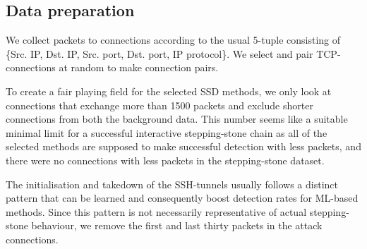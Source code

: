 \documentclass[runningheads,11pt]{llncs}\usepackage[]{graphicx}\usepackage[]{color}
\begin{document}

\subsection{Data preparation}


We collect packets to connections according to the usual 5-tuple consisting of \{Src. IP, Dst. IP, Src. port, Dst. port, IP protocol\}. We select and pair TCP-connections at random to make %
connection pairs. 

To create a fair playing field for the selected SSD methods, we only look at connections that exchange more than 1500 packets and exclude shorter connections from both the background data. This number seems like a suitable minimal limit for a successful interactive stepping-stone chain as all of the selected methods are supposed to make successful detection with less packets, and there were no connections with less packets in the stepping-stone dataset. %

The initialisation and takedown of the SSH-tunnels usually follows a distinct pattern that can be learned and consequently boost detection rates for ML-based methods. Since this pattern is not necessarily representative of actual stepping-stone behaviour, we remove the first and last thirty packets in the attack connections. %
\end{document}
